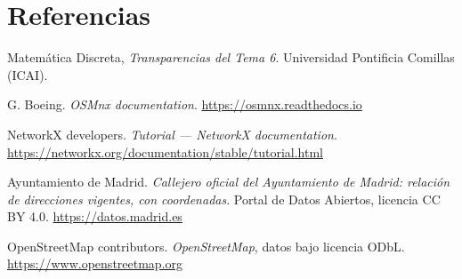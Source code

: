 \documentclass[11pt,a4paper]{article}
\begin{document}
\section*{Referencias}
\begin{enumerate}[label={[\arabic*]},leftmargin=2.2em]
\item Matemática Discreta, \emph{Transparencias del Tema 6}. Universidad Pontificia Comillas (ICAI).
\item G. Boeing. \emph{OSMnx documentation}. \url{https://osmnx.readthedocs.io}
\item NetworkX developers. \emph{Tutorial — NetworkX documentation}. \url{https://networkx.org/documentation/stable/tutorial.html}
\item Ayuntamiento de Madrid. \emph{Callejero oficial del Ayuntamiento de Madrid: relación de direcciones vigentes, con coordenadas}. Portal de Datos Abiertos, licencia CC BY 4.0. \url{https://datos.madrid.es}
\item OpenStreetMap contributors. \emph{OpenStreetMap}, datos bajo licencia ODbL. \url{https://www.openstreetmap.org}
\end{enumerate}
\end{document}

